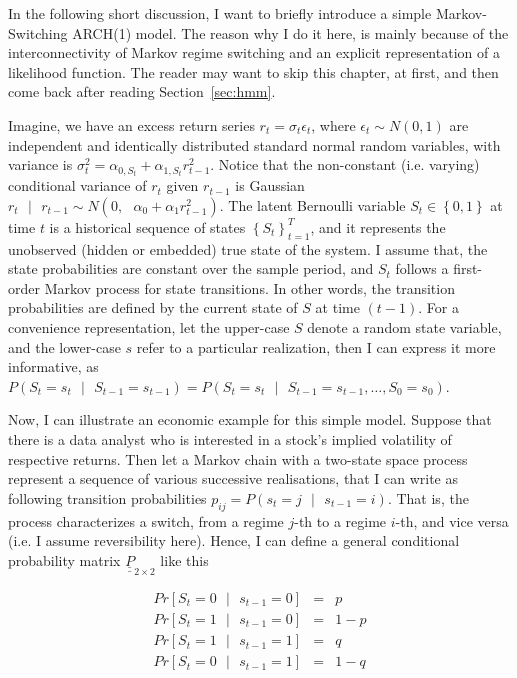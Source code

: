 \documentclass[a4paper,11pt,english]{article}
\begin{document}
				In the following short discussion, I want to briefly introduce a simple Markov-Switching ARCH(1) model. The reason why I do 
				it here, is mainly because of the interconnectivity of Markov regime switching and an explicit representation of a likelihood function. 
				The reader may want to skip this chapter, at first, and then come back after reading Section~\ref{sec:hmm}.
			
				Imagine, we have an excess return series $r_t=\sigma_t\epsilon_t$, where $\epsilon_t \sim N(0,1)$ are independent and identically 
				distributed standard normal random variables, with variance is $\sigma_t^2= \alpha_{0,S_t} + \alpha_{1,S_t}r_{t-1}^2$.  Notice that the 
				non-constant (i.e. varying) conditional variance of $r_t$ given $r_{t-1}$ is Gaussian $r_t \text{ }|\text{ } r_{t-1} \sim N(0, \text{ } 
				\alpha_0 + \alpha_1 r_{t-1}^2)$. The latent Bernoulli variable $S_t \in \left\{0, 1 \right\}$ at time $t$ is a historical sequence of 
				states $\left\{S_t \right\}_{t=1}^T$, and it represents the unobserved (hidden or embedded) true state of the system. I assume that, the 
				state probabilities are constant over the sample period, and $S_t$ follows a first-order Markov process for state transitions. In other 
				words, the transition probabilities are defined by the current state of $S$ at time $(t-1)$. For a convenience representation, let the 
				upper-case $S$ denote a random state variable, and the lower-case $s$ refer to a particular realization, then I can express it more 
				informative, as $P(S_t = s_t \text{ } | \text{ } S_{t-1} = s_{t-1}) = P(S_t=s_t \text{ } | \text{ }S_{t-1} = s_{t-1},\ldots, S_0 = s_0)$. 
			
				Now, I can illustrate an economic example for this simple model. Suppose that there is a data analyst who is interested in a stock's 
				implied volatility of respective returns. Then let a Markov chain with a two-state space process represent a sequence of  various 
				successive realisations, that I can write as following transition probabilities $p_{ij} = P(s_t = j \text{ } | \text{ } s_{t-1} = i)$. 
				That is, the process characterizes a switch, from a regime $j$-th to a regime $i$-th, and vice versa (i.e. I assume reversibility here). 
				Hence, I can define a  general conditional probability matrix $\underline{\underline{P}}_{2 \times 2 }$ like this 

				\begin{eqnarray*}
					Pr\left[S_t = 0 \text{ } | \text{ } s_{t-1} = 0 \right] &=& p \\
					Pr\left[S_t = 1 \text{ } | \text{ } s_{t-1} = 0 \right] &=& 1 - p\\
					Pr\left[S_t = 1 \text{ } | \text{ } s_{t-1} = 1 \right] &=& q \\
					Pr\left[S_t = 0 \text{ } | \text{ } s_{t-1} = 1 \right] &=& 1 - q 
				\end{eqnarray*}									
\end{document}
